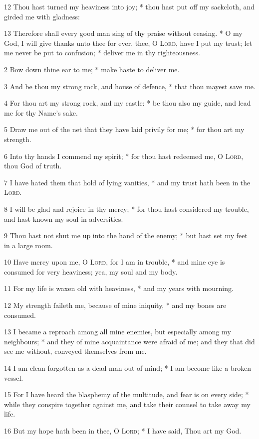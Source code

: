 12 Thou hast turned my heaviness into joy; * thou hast put off my sackcloth, and girded me with gladness:\par
13 Therefore shall every good man sing of thy praise without ceasing. * O my God, I will give thanks unto thee for ever.
 thee, O {\textsc{Lord}}, have I put my trust; let me never be put to confusion; * deliver me in thy righteousness.\par
2 Bow down thine ear to me; * make haste to deliver me.\par
3 And be thou my strong rock, and house of defence, * that thou mayest save me.\par
4 For thou art my strong rock, and my castle: * be thou also my guide, and lead me for thy Name's sake.\par
5 Draw me out of the net that they have laid privily for me; * for thou art my strength.\par
6 Into thy hands I commend my spirit; * for thou hast redeemed me, O {\textsc{Lord}}, thou God of truth.\par
7 I have hated them that hold of lying vanities, * and my trust hath been in the {\textsc{Lord}}.\par
8 I will be glad and rejoice in thy mercy; * for thou hast considered my trouble, and hast known my soul in adversities.\par
9 Thou hast not shut me up into the hand of the enemy; * but hast set my feet in a large room.\par
10 Have mercy upon me, O {\textsc{Lord}}, for I am in trouble, * and mine eye is consumed for very heaviness; yea, my soul and my body.\par
11 For my life is waxen old with heaviness, * and my years with mourning.\par
12 My strength faileth me, because of mine iniquity, * and my bones are consumed.\par
13 I became a reproach among all mine enemies, but especially among my neighbours; * and they of mine acquaintance were afraid of me; and they that did see me without, conveyed themselves from me.\par
14 I am clean forgotten as a dead man out of mind; * I am become like a broken vessel.\par
15 For I have heard the blasphemy of the multitude, and fear is on every side; * while they conspire together against me, and take their counsel to take away my life.\par
16 But my hope hath been in thee, O {\textsc{Lord}}; * I have said, Thou art my God.\par
